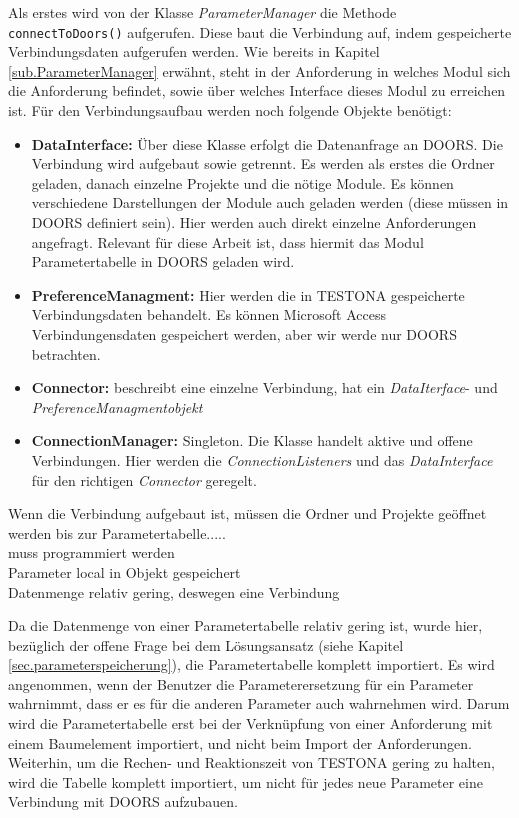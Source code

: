 Als erstes wird von der Klasse \textit{ParameterManager} die Methode \texttt{connectToDoors()} aufgerufen. Diese baut die Verbindung auf, indem gespeicherte Verbindungsdaten aufgerufen werden. Wie bereits in Kapitel \ref{sub.ParameterManager} erwähnt, steht in der Anforderung in welches Modul sich die Anforderung befindet, sowie über welches Interface dieses Modul zu erreichen ist. Für den Verbindungsaufbau werden noch folgende Objekte benötigt:

\begin{itemize}
\item \textbf{DataInterface: }Über diese Klasse erfolgt die Datenanfrage an DOORS. Die Verbindung wird aufgebaut sowie getrennt. Es werden als erstes die Ordner geladen, danach einzelne Projekte und die nötige Module. Es können verschiedene Darstellungen der Module auch geladen werden (diese müssen in DOORS definiert sein). Hier werden auch direkt einzelne Anforderungen angefragt. Relevant für diese Arbeit ist, dass hiermit das Modul Parametertabelle in DOORS geladen wird.
\item \textbf{PreferenceManagment: } Hier werden die in TESTONA gespeicherte Verbindungsdaten behandelt. Es können Microsoft Access Verbindungensdaten gespeichert werden, aber wir werde nur DOORS betrachten.
\item \textbf{Connector: }beschreibt eine einzelne Verbindung, hat ein \textit{DataIterface}- und \textit{PreferenceManagmentobjekt}
\item \textbf{ConnectionManager: }Singleton. Die Klasse handelt aktive und offene Verbindungen. Hier werden die \textit{ConnectionListeners} und das \textit{DataInterface} für den richtigen \textit{Connector} geregelt.
\end{itemize}

Wenn die Verbindung aufgebaut ist, müssen die Ordner und Projekte geöffnet werden bis zur Parametertabelle.....\\

muss programmiert werden\\

Parameter local in Objekt gespeichert\\
Datenmenge relativ gering, deswegen eine Verbindung 

Da die Datenmenge von einer Parametertabelle relativ gering ist, wurde hier, bezüglich der offene Frage bei dem Lösungsansatz (siehe Kapitel \ref{sec.parameterspeicherung}), die Parametertabelle komplett importiert. Es wird angenommen, wenn der Benutzer die Parameterersetzung für ein Parameter wahrnimmt, dass er es für die anderen Parameter auch wahrnehmen wird. Darum wird die Parametertabelle erst bei der Verknüpfung von einer Anforderung mit einem Baumelement importiert, und nicht beim Import der Anforderungen. Weiterhin, um die Rechen- und Reaktionszeit von TESTONA gering zu halten, wird die Tabelle komplett importiert, um nicht für jedes neue Parameter eine Verbindung mit DOORS aufzubauen.



